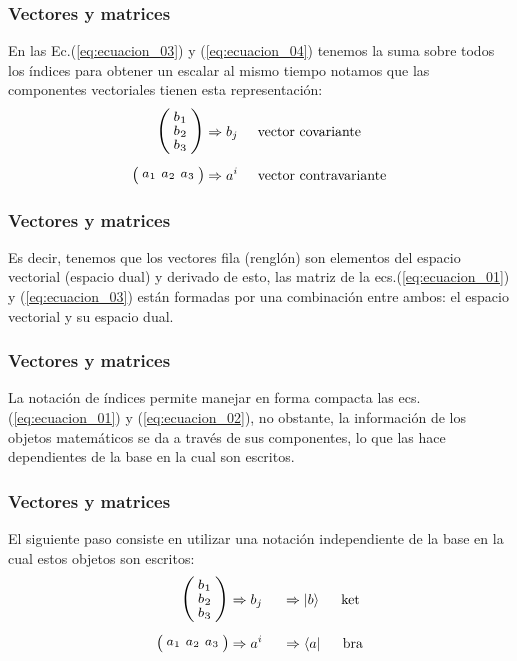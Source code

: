 \documentclass[12pt]{beamer}
\begin{document}
\begin{frame}
\frametitle{Vectores y matrices}
En las Ec.(\ref{eq:ecuacion_03}) y (\ref{eq:ecuacion_04}) tenemos la suma sobre todos los índices para obtener un escalar al mismo tiempo notamos que las componentes vectoriales tienen esta representación:
\pause
\begin{align}
\begin{aligned}
\resizebox{0.1\hsize}{!}{%
$\smqty(\xmat*{b}{3}{1})$%
} &\Rightarrow b_{j} \hspace{0.5cm} \mbox{vector covariante}
\\[0.5em]
\resizebox{0.15\hsize}{!}{%
$\smqty(\xmat*{a}{1}{3})$%
} &\Rightarrow a^{i} \hspace{0.5cm} \mbox{vector contravariante}
\end{aligned}
\label{eq:ecuacion_05}
\end{align}
\end{frame}
\begin{frame}
\frametitle{Vectores y matrices}
Es decir, tenemos que los vectores fila (renglón) son elementos del espacio vectorial (espacio dual) y derivado de esto, las matriz de la ecs.(\ref{eq:ecuacion_01}) y (\ref{eq:ecuacion_03}) están formadas por una combinación entre ambos: el espacio vectorial y su espacio dual.
\end{frame}
\begin{frame}
\frametitle{Vectores y matrices}
La notación de índices permite manejar en forma compacta las ecs. (\ref{eq:ecuacion_01}) y (\ref{eq:ecuacion_02}), no obstante, la información de los objetos matemáticos se da a través de sus componentes, lo que las hace dependientes de la base en la cual son escritos.
\end{frame}
\begin{frame}
\frametitle{Vectores y matrices}
El siguiente paso consiste en utilizar una notación independiente de la base en la cual estos objetos son escritos:
\begin{align}
\begin{aligned}
\resizebox{0.1\hsize}{!}{%
$\smqty(\xmat*{b}{3}{1})$%
} &\Rightarrow b_{j} \hspace{0.5cm} \Rightarrow \ket{b} \hspace{0.5cm} \mbox{ket}
\\[0.5em]
\resizebox{0.15\hsize}{!}{%
$\smqty(\xmat*{a}{1}{3})$%
} &\Rightarrow a^{i} \hspace{0.5cm} \Rightarrow \bra{a} \hspace{0.5cm} \mbox{bra}
\end{aligned}
\label{eq:ecuacion_06}
\end{align}
\end{frame}
\end{document}

